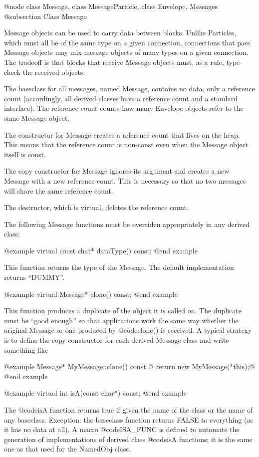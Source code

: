 @node class Message, class MessageParticle, class Envelope, Messages
@subsection Class Message

Message objects can be used to carry data between blocks.  Unlike
Particles, which must all be of the same type on a given connection,
connections that pass Message objects may mix message objects of
many types on a given connection.  The tradeoff is that blocks that
receive Message objects must, as a rule, type-check the received
objects.

The baseclass for all messages, named Message, contains no data, only
a reference count (accordingly, all derived classes have a reference
count and a standard interface).  The reference count counts how many
Envelope objects refer to the same Message object.

The constructor for Message creates a reference count that lives on
the heap.  This means that the reference count is non-const even when
the Message object itself is const.

The copy constructor for Message ignores its argument and creates a
new Message with a new reference count.  This is necessary so that no
two messages will share the same reference count.

The destructor, which is virtual, deletes the reference count.

The following Message functions must be overriden appropriately in any
derived class:

@example
virtual const char* dataType() const;
@end example

This function returns the type of the Message.  The default
implementation returns ``DUMMY''.

@example
virtual Message* clone() const;
@end example

This function produces a duplicate of the object it is called on.
The duplicate must be ``good enough'' so that applications work the
same way whether the original Message or one produced by @code{clone()}
is received.  A typical strategy is to define the copy constructor
for each derived Message class and write something like

@example
Message* MyMessage::clone() const @{ return new MyMessage(*this);@}
@end example

@example
virtual int isA(const char*) const;
@end example

The @code{isA} function returns true if given the name of the class
or the name of any baseclass.  Exception: the baseclass function returns
FALSE to everything (as it has no data at all).  A macro @code{ISA_FUNC}
is defined to automate the generation of implementations of derived
class @code{isA} functions; it is the same one as that used for the
NamedObj class.

